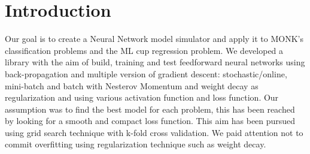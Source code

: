 \section{Introduction}
Our goal is to create a Neural Network model simulator and apply it to MONK's classification problems and the ML cup regression problem. 
We developed a library with the aim of build, training and test feedforward neural networks using back-propagation and multiple version of gradient descent: stochastic/online, mini-batch and batch with Nesterov Momentum and weight decay as regularization and using various activation function and loss function. 
Our assumption was to find the best model for each problem, this has been reached by looking for a smooth  and compact loss function. This aim has been pursued using grid search technique with k-fold cross validation. We paid attention not to commit overfitting using regularization technique such as weight decay. 